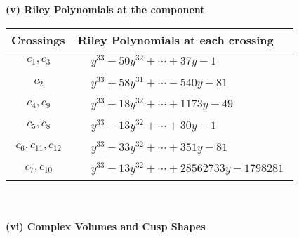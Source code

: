 \documentclass[1p]{elsarticle_modified}
\theoremstyle{definition}
\begin{document}
\newpage\renewcommand{\arraystretch}{1}
\flushleft \textbf{(v) Riley Polynomials at the component}\newline \\
\begin{tabular}{m{50pt}|m{274pt}}
Crossings & \hspace{64pt}Riley Polynomials at each crossing \\
\hline $$\begin{aligned}c_{1},c_{3}\end{aligned}$$&$\begin{aligned}
&y^{33}-50 y^{32}+\cdots+37 y-1
\end{aligned}$\\
\hline $$\begin{aligned}c_{2}\end{aligned}$$&$\begin{aligned}
&y^{33}+58 y^{31}+\cdots-540 y-81
\end{aligned}$\\
\hline $$\begin{aligned}c_{4},c_{9}\end{aligned}$$&$\begin{aligned}
&y^{33}+18 y^{32}+\cdots+1173 y-49
\end{aligned}$\\
\hline $$\begin{aligned}c_{5},c_{8}\end{aligned}$$&$\begin{aligned}
&y^{33}-13 y^{32}+\cdots+30 y-1
\end{aligned}$\\
\hline $$\begin{aligned}c_{6},c_{11},c_{12}\end{aligned}$$&$\begin{aligned}
&y^{33}-33 y^{32}+\cdots+351 y-81
\end{aligned}$\\
\hline $$\begin{aligned}c_{7},c_{10}\end{aligned}$$&$\begin{aligned}
&y^{33}-13 y^{32}+\cdots+28562733 y-1798281
\end{aligned}$\\
\hline
\end{tabular}\\~\\
\newpage\flushleft \textbf{(vi) Complex Volumes and Cusp Shapes}
\end{document}
